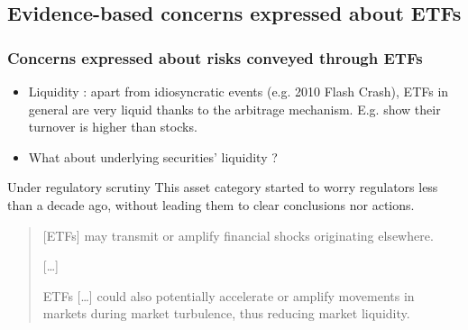 \documentclass[9pt, usenames, dvipsnames]{beamer}
\begin{document}
\subsection{Evidence-based concerns expressed about ETFs}
\begin{frame}
  \frametitle{Concerns expressed about risks conveyed through ETFs}
  \begin{itemize}
  \item Liquidity : apart from idiosyncratic events (e.g. 2010 Flash Crash), ETFs in general are very liquid thanks to the arbitrage mechanism. E.g. \textcite{Ben-David2018} show their turnover is higher than stocks.
  \item What about underlying securities' liquidity ?
  \end{itemize}
  \begin{alertblock}{Under regulatory scrutiny}
    This asset category started to worry regulators less than a decade ago, without leading them to clear conclusions nor actions.
    \begin{quotation}
      [ETFs] may transmit or amplify financial shocks originating elsewhere.

      [\dots]

      ETFs [\dots] could also potentially accelerate or amplify movements in markets during market turbulence, thus reducing market liquidity.
    \end{quotation}
  \end{alertblock}
  
\end{frame}
\end{document}
